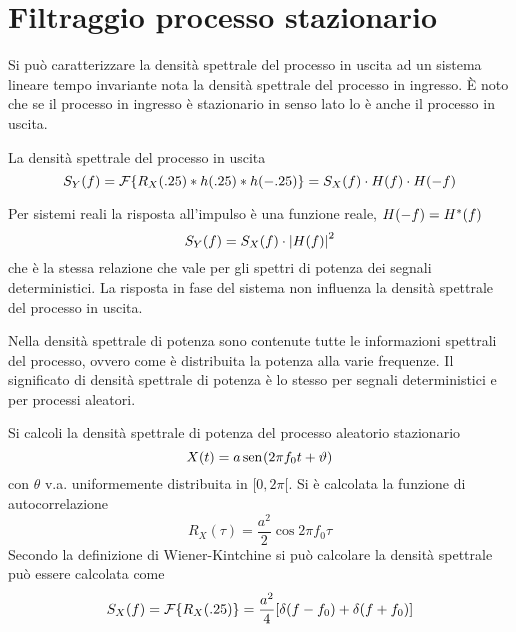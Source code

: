 \section{Filtraggio processo stazionario}
Si può caratterizzare la densità spettrale del processo in uscita ad un sistema lineare tempo invariante nota la densità spettrale del processo in ingresso.
\`{E} noto che se il processo in ingresso è stazionario in senso lato lo è anche il processo in uscita.

La densità spettrale del processo in uscita
\begin{equation}
S_Y(f)=\operatorname{\mathcal{F}}\!\left\lbrace{R_X(.25)\ast h(.25)\ast h(-.25)}\right\rbrace=S_X(f)\cdot H(f)\cdot H(-f)
\end{equation}

Per sistemi reali la risposta all'impulso è una funzione reale, $H(-f)={H}^\ast(f)$
\begin{equation}
S_Y(f)=S_X(f)\cdot\left|{H(f)}\right|^2
\end{equation}
che è la stessa relazione che vale per gli spettri di potenza dei segnali deterministici.
La risposta in fase del sistema non influenza la densità spettrale del processo in uscita.

Nella densità spettrale di potenza sono contenute tutte le informazioni spettrali del processo, ovvero come è distribuita la potenza alla varie frequenze. Il significato di densità spettrale di potenza è lo stesso per segnali deterministici e per processi aleatori.

\begin{esempio}
Si calcoli la densità spettrale di potenza del processo aleatorio stazionario \[X(t)=a\,{\operatorname{sen}}^{}\!\left({2\pi f_0 t+\vartheta}\right)\] con $\theta$ v.a. uniformemente distribuita in $[0,2\pi[$. Si è calcolata la funzione di autocorrelazione
\[R_X(\tau)=\frac{a^2}{2}\cos{2\pi f_0\tau}\]
Secondo la definizione di Wiener-Kintchine si può calcolare la densità spettrale può essere calcolata come
\[S_X(f)=\operatorname{\mathcal{F}}\!\left\lbrace{R_X(.25)}\right\rbrace=\frac{a^2}{4}[\operatorname{\delta}(f-f_0)+\operatorname{\delta}(f+f_0)]\]
\begin{figure}[h!]
	\centering{}
\end{figure}
\end{esempio} 

